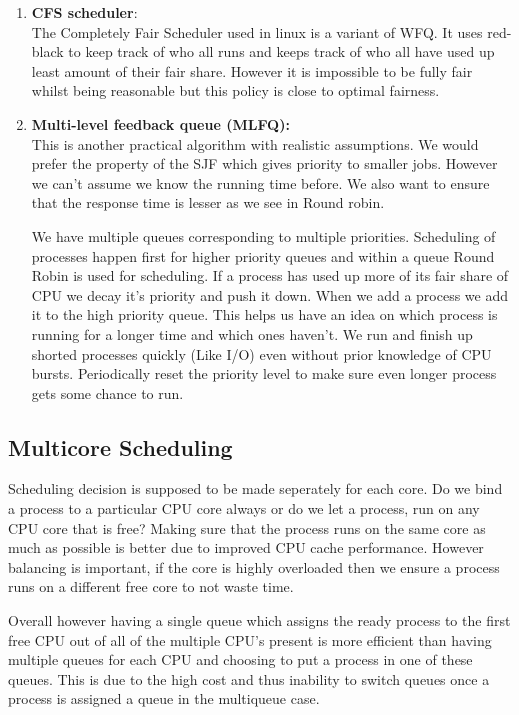 \documentclass[12pt]{article}
\newcommand{\tbox}[1]{\noindent\fbox{\parbox{\textwidth}{#1}}}
\begin{document}
\begin{enumerate}
\item 
\textbf{CFS scheduler}:\\The Completely Fair Scheduler used in linux is a variant of WFQ. It uses red-black to keep track of who all runs and keeps track of who all have used up least amount of their fair share.
However it is impossible to be fully fair whilst being reasonable but this policy is close to optimal fairness.


\item \textbf{Multi-level feedback queue (MLFQ):} \\
This is another practical algorithm with realistic assumptions. We would prefer the property of the SJF which gives priority to smaller jobs. However we can't assume we know the running time before.
We also want to ensure that the response time is lesser as we see in Round robin. 

We have multiple queues corresponding to multiple priorities. Scheduling of processes happen first for higher priority queues and within a queue Round Robin is used for scheduling. If a process has used up more of its fair share of CPU we decay it's priority and push it down. When we 
add a process we add it to the high priority queue. This helps us have an idea on which process is running for a longer time and which ones haven't. We run and finish up shorted processes quickly (Like I/O) even without prior knowledge of CPU bursts. Periodically reset the priority level to make sure even longer
process gets some chance to run.
\end{enumerate}

\newpage
\noindent\tbox{
    \begin{center}
    \textbf{\Huge Lecture 10}
    \end{center}
}

\subsection{Multicore Scheduling}
Scheduling decision is supposed to be made seperately for each core. Do we bind a process to a particular CPU core always or do we let a process,
run on any CPU core that is free? Making sure that the process runs on the same core as much as possible is better due to improved CPU cache performance.
However balancing is important, if the core is highly overloaded then we ensure a process runs on a different free core to not waste time. 

Overall however having
a single queue which assigns the ready process to the first free CPU out of all of the multiple CPU's present is more efficient than having
multiple queues for each CPU and choosing to put a process in one of these queues. This is due to the high cost and thus inability to switch queues once a process
is assigned a queue in the multiqueue case.
\end{document}
